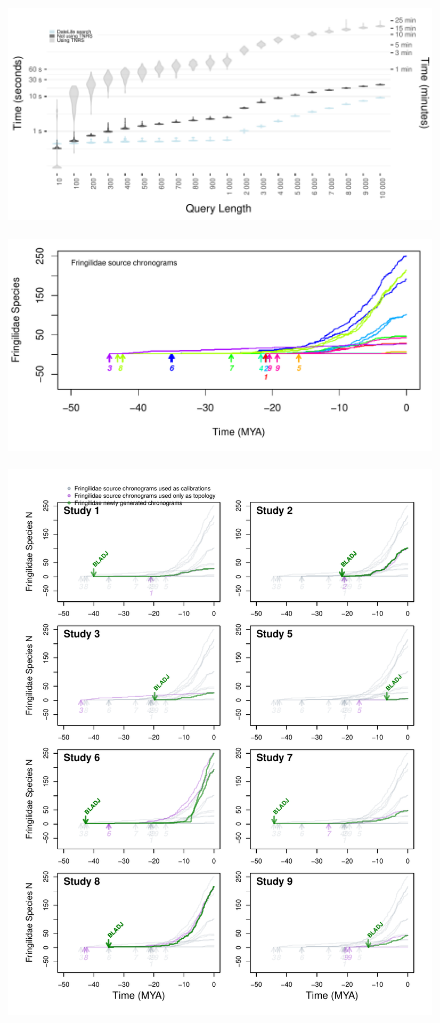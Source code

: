 \documentclass[]{article}
\begin{document}
\newpage

\begin{figure}[!h]
\includegraphics[width=1\linewidth]{fig_runtime1.pdf}
\caption{}
\label{fig:runtime1}
\end{figure}

\newpage

\begin{figure}[!h]
\includegraphics[width=1\linewidth]{fig_schronograms1.pdf}
\caption{}
\label{fig:schronograms}
\end{figure}

\newpage

\begin{figure}[!ht]
\includegraphics{fig_crossval_bladj.pdf}
\caption{}
\label{fig:cvbladj}
\end{figure}
\end{document}
